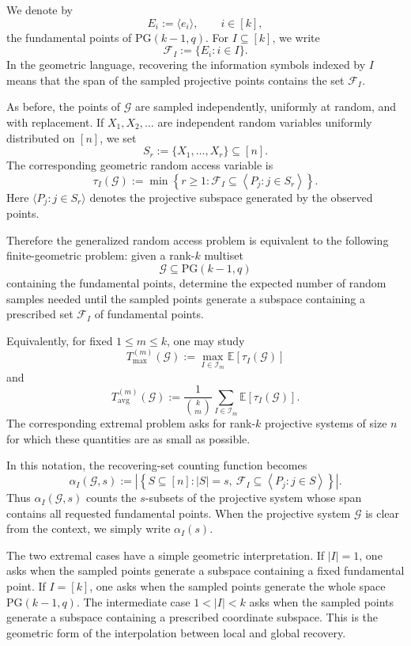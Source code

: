 \documentclass[11pt,a4paper]{article}
\numberwithin{equation}{section}
\theoremstyle{definition}
\theoremstyle{definition}
\newcommand{\PG}{\mathrm{PG}}
\newcommand{\E}{\mathbb{E}}
\newcommand{\cG}{\mathcal{G}}
\newcommand{\cF}{\mathcal{F}}
\newcommand{\cI}{\mathcal{I}}
\newcommand{\Tmax}{T_{\max}}
\newcommand{\Tavg}{T_{\mathrm{avg}}}
\begin{document}
We denote by
\[
E_i:=\langle e_i\rangle,\qquad i\in[k],
\]
the fundamental points of $\PG(k-1,q)$.  For $I\subseteq[k]$, we write
\[
\cF_I:=\{E_i:i\in I\}.
\]
In the geometric language, recovering the information symbols indexed by
$I$ means that the span of the sampled projective points contains the set
$\cF_I$.

As before, the points of $\cG$ are sampled independently, uniformly at
random, and with replacement.  If $X_1,X_2,\ldots$ are independent random
variables uniformly distributed on $[n]$, we set
\[
S_r:=\{X_1,\ldots,X_r\}\subseteq[n].
\]
The corresponding geometric random access variable is
\[
\tau_I(\cG):=
\min\left\{
r\geq 1:
\cF_I\subseteq
\left\langle P_j:j\in S_r\right\rangle
\right\}.
\]
Here $\langle P_j:j\in S_r\rangle$ denotes the projective subspace generated
by the observed points.

Therefore the generalized random access problem is equivalent to the following
finite-geometric problem: given a rank-$k$ multiset
\[
\cG\subseteq \PG(k-1,q)
\]
containing the fundamental points, determine the expected number of random
samples needed until the sampled points generate a subspace containing a
prescribed set $\cF_I$ of fundamental points.

Equivalently, for fixed $1\leq m\leq k$, one may study
\[
\Tmax^{(m)}(\cG):=
\max_{I\in\cI_m}\E[\tau_I(\cG)]
\]
and
\[
\Tavg^{(m)}(\cG):=
\frac{1}{\binom{k}{m}}
\sum_{I\in\cI_m}\E[\tau_I(\cG)].
\]
The corresponding extremal problem asks for rank-$k$ projective systems of
size $n$ for which these quantities are as small as possible.

In this notation, the recovering-set counting function becomes
\[
\alpha_I(\cG,s):=
\left|
\left\{
S\subseteq[n]:
|S|=s,\ 
\cF_I\subseteq
\left\langle P_j:j\in S\right\rangle
\right\}
\right|.
\]
Thus $\alpha_I(\cG,s)$ counts the $s$-subsets of the projective system
whose span contains all requested fundamental points.  When the projective
system $\cG$ is clear from the context, we simply write $\alpha_I(s)$.

The two extremal cases have a simple geometric interpretation.  If
$|I|=1$, one asks when the sampled points generate a subspace containing a
fixed fundamental point.  If $I=[k]$, one asks when the sampled points
generate the whole space $\PG(k-1,q)$.  The intermediate case
$1<|I|<k$ asks when the sampled points generate a subspace containing a
prescribed coordinate subspace.  This is the geometric form of the
interpolation between local and global recovery.
\end{document}
